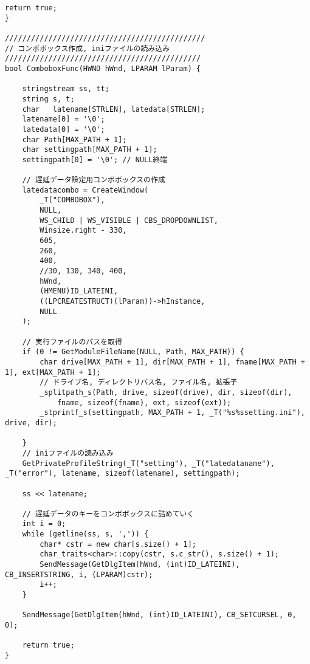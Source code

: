 \begin{lstlisting}[caption=window.cpp]
	return true;
}

//////////////////////////////////////////////
// コンボボックス作成, iniファイルの読み込み
/////////////////////////////////////////////
bool ComboboxFunc(HWND hWnd, LPARAM lParam) {

	stringstream ss, tt;
	string s, t;
	char   latename[STRLEN], latedata[STRLEN];
	latename[0] = '\0';
	latedata[0] = '\0';
	char Path[MAX_PATH + 1];
	char settingpath[MAX_PATH + 1];
	settingpath[0] = '\0'; // NULL終端

	// 遅延データ設定用コンボボックスの作成
	latedatacombo = CreateWindow(
		_T("COMBOBOX"),
		NULL,
		WS_CHILD | WS_VISIBLE | CBS_DROPDOWNLIST,
		Winsize.right - 330,
		605,
		260,
		400,
		//30, 130, 340, 400,
		hWnd,
		(HMENU)ID_LATEINI,
		((LPCREATESTRUCT)(lParam))->hInstance,
		NULL
	);

	// 実行ファイルのパスを取得
	if (0 != GetModuleFileName(NULL, Path, MAX_PATH)) {
		char drive[MAX_PATH + 1], dir[MAX_PATH + 1], fname[MAX_PATH + 1], ext[MAX_PATH + 1];
		// ドライブ名, ディレクトリパス名, ファイル名, 拡張子
		_splitpath_s(Path, drive, sizeof(drive), dir, sizeof(dir),
			fname, sizeof(fname), ext, sizeof(ext));
		_stprintf_s(settingpath, MAX_PATH + 1, _T("%s%ssetting.ini"), drive, dir);

	}
	// iniファイルの読み込み
	GetPrivateProfileString(_T("setting"), _T("latedataname"), _T("error"), latename, sizeof(latename), settingpath);

	ss << latename;

	// 遅延データのキーをコンボボックスに詰めていく
	int i = 0;
	while (getline(ss, s, ',')) {
		char* cstr = new char[s.size() + 1];
		char_traits<char>::copy(cstr, s.c_str(), s.size() + 1);
		SendMessage(GetDlgItem(hWnd, (int)ID_LATEINI), CB_INSERTSTRING, i, (LPARAM)cstr);
		i++;
	}

	SendMessage(GetDlgItem(hWnd, (int)ID_LATEINI), CB_SETCURSEL, 0, 0);

	return true;
}



\end{lstlisting}



